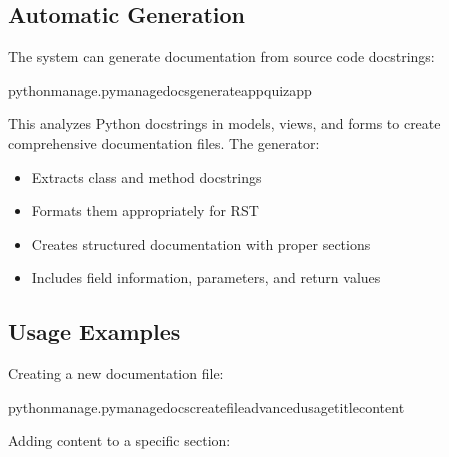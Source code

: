 \documentclass[letterpaper,10pt,english]{sphinxmanual}
\begin{document}
\subsection{Automatic Generation}
\label{\detokenize{documentation_tools:automatic-generation}}
\sphinxAtStartPar
The system can generate documentation from source code docstrings:

\begin{sphinxVerbatim}[commandchars=\\\{\}]
pythonmanage.pymanage\PYGZus{}docsgenerate\PYGZhy{}\PYGZhy{}appquiz\PYGZus{}app
\end{sphinxVerbatim}

\sphinxAtStartPar
This analyzes Python docstrings in models, views, and forms to create comprehensive documentation files. The generator:
\begin{itemize}
\item {} 
\sphinxAtStartPar
Extracts class and method docstrings

\item {} 
\sphinxAtStartPar
Formats them appropriately for RST

\item {} 
\sphinxAtStartPar
Creates structured documentation with proper sections

\item {} 
\sphinxAtStartPar
Includes field information, parameters, and return values

\end{itemize}


\subsection{Usage Examples}
\label{\detokenize{documentation_tools:usage-examples}}
\sphinxAtStartPar
Creating a new documentation file:

\begin{sphinxVerbatim}[commandchars=\\\{\}]
pythonmanage.pymanage\PYGZus{}docscreate\PYGZhy{}\PYGZhy{}fileadvanced\PYGZus{}usage\PYGZhy{}\PYGZhy{}title\PYGZhy{}\PYGZhy{}content
\end{sphinxVerbatim}

\sphinxAtStartPar
Adding content to a specific section:
\end{document}
